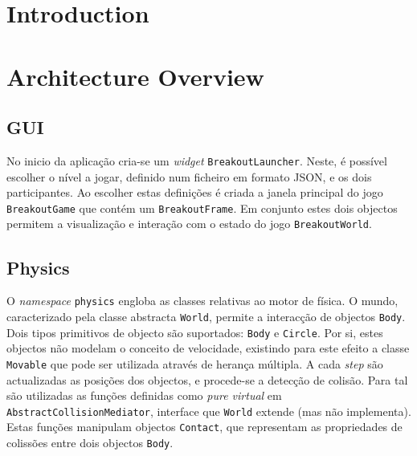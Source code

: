 \documentclass[a4paper]{article}
\title{\documentTitle}
\author{\documentAuthors}
\begin{document}
\renewcommand{\figurename}{Figure}
\maketitle
\cleardoublepage

\tableofcontents
\cleardoublepage

\setlength{\parindent}{1cm}
\setlength{\parskip}{0.3cm}

\hyphenation{}


\section{Introduction}

\section{Architecture Overview}
\subsection{GUI}

No inicio da aplicação cria-se um \emph{widget} \texttt{BreakoutLauncher}. Neste, é possível escolher o nível a jogar, definido num ficheiro em formato JSON, e os dois participantes. Ao escolher estas definições é criada a janela principal do jogo \texttt{BreakoutGame} que contém um \texttt{BreakoutFrame}. Em conjunto estes dois objectos permitem a visualização e interação com o estado do jogo \texttt{BreakoutWorld}.

\subsection{Physics}
O \emph{namespace} \texttt{physics} engloba as classes relativas ao motor de física. O mundo, caracterizado pela classe abstracta \texttt{World}, permite a interacção de objectos \texttt{Body}. Dois tipos primitivos de objecto são suportados: \texttt{Body} e \texttt{Circle}. Por si, estes objectos não modelam o conceito de velocidade, existindo para este efeito a classe \texttt{Movable} que pode ser utilizada através de herança múltipla. A cada \emph{step} são actualizadas as posições dos objectos, e procede-se a detecção de colisão. Para tal são utilizadas as funções definidas como \emph{pure virtual} em \texttt{AbstractCollisionMediator}, interface que \texttt{World} extende (mas não implementa). Estas funções manipulam objectos \texttt{Contact}, que representam as propriedades de colissões entre dois objectos \texttt{Body}. 
\end{document}
